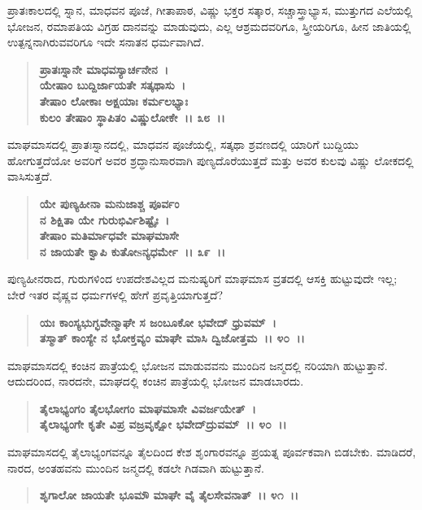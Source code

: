 ಪ್ರಾತಃಕಾಲದಲ್ಲಿ ಸ್ನಾನ, ಮಾಧವನ ಪೂಜೆ, ಗೀತಾಪಾಠ, ವಿಷ್ಣು ಭಕ್ತರ ಸತ್ಕಾರ, ಸಚ್ಚಾಸ್ತ್ರಾಭ್ಯಾಸ, ಮುತ್ತುಗದ ಎಲೆಯಲ್ಲಿ ಭೋಜನ, ರಮಾಪತಿಯ ವಿಗ್ರಹ ದಾನವನ್ನು ಮಾಡುವುದು, ಎಲ್ಲ ಆಶ್ರಮದವರಿಗೂ, ಸ್ತ್ರೀಯರಿಗೂ, ಹೀನ ಜಾತಿಯಲ್ಲಿ ಉತ್ಪನ್ನನಾಗಿರುವವರಿಗೂ ಇದೇ ಸನಾತನ ಧರ್ಮವಾಗಿದೆ.

\begin{verse}
\textbf{ಪ್ರಾತಃಸ್ನಾನೇ ಮಾಧವಸ್ಯಾರ್ಚನೇನ~।}\\\textbf{ಯೇಷಾಂ ಬುದ್ದಿರ್ಜಾಯತೇ ಸತ್ಕಥಾಸು~। }\\\textbf{ತೇಷಾಂ ಲೋಕಾಃ ಅಕ್ಷಯಾಃ ಕರ್ಮಲಭ್ಯಾಃ} \\\textbf{ಕುಲಂ ತೇಷಾಂ ಸ್ಥಾಪಿತಂ ವಿಷ್ಣುಲೋಕೇ~।। ೩೮~।।}
\end{verse}

ಮಾಘಮಾಸದಲ್ಲಿ ಪ್ರಾತಃಸ್ನಾನದಲ್ಲಿ, ಮಾಧವನ ಪೂಜೆಯಲ್ಲಿ, ಸತ್ಕಥಾ ಶ್ರವಣದಲ್ಲಿ ಯಾರಿಗೆ ಬುದ್ದಿಯು ಹೋಗುತ್ತದೆಯೋ ಅವರಿಗೆ ಅವರ ಶ್ರದ್ಧಾನುಸಾರವಾಗಿ ಪುಣ್ಯ\break ದೊರೆಯುತ್ತದೆ ಮತ್ತು ಅವರ ಕುಲವು ವಿಷ್ಣು ಲೋಕದಲ್ಲಿ ವಾಸಿಸುತ್ತದೆ.

\begin{verse}
\textbf{ಯೇ ಪುಣ್ಯಹೀನಾ ಮನುಜಾಶ್ಚ ಪೂರ್ವಂ}\\\textbf{ನ ಶಿಕ್ಷಿತಾ ಯೇ ಗುರುಭಿರ್ವಿಶಿಷ್ಟೈಃ~। }\\\textbf{ತೇಷಾಂ ಮತಿರ್ಮಾಧವೇ ಮಾಘಮಾಸೇ} \\\textbf{ನ ಜಾಯತೇ ಕ್ವಾಪಿ ಕುತೋsನ್ಯಧರ್ಮೇ~।। ೩೯~।।}
\end{verse}

ಪುಣ್ಯಹೀನರಾದ, ಗುರುಗಳಿಂದ ಉಪದೇಶವಿಲ್ಲದ ಮನುಷ್ಯರಿಗೆ ಮಾಘಮಾಸ ವ್ರತದಲ್ಲಿ ಆಸಕ್ತಿ ಹುಟ್ಟುವುದೇ ಇಲ್ಲ; ಬೇರೆ ಇತರ ವೈಷ್ಣವ ಧರ್ಮಗಳಲ್ಲಿ ಹೇಗೆ ಪ್ರವೃತ್ತಿಯಾಗುತ್ತದೆ?

\begin{verse}
\textbf{ಯಃ ಕಾಂಸ್ಯಭುಗ್ಭವೇನ್ಮಾಘೇ ಸ ಜಂಬೂಕೋ ಭವೇದ್ ಧ್ರುವಮ್~।}\\\textbf{ತಸ್ಮಾತ್ ಕಾಂಸ್ಯೇ ನ ಭೋಕ್ತವ್ಯಂ ಮಾಘೇ ಮಾಸಿ ದ್ವಿಜೋತ್ತಮ~।। ೪೦~।।}
\end{verse}

ಮಾಘಮಾಸದಲ್ಲಿ ಕಂಚಿನ ಪಾತ್ರೆಯಲ್ಲಿ ಭೋಜನ ಮಾಡುವವನು ಮುಂದಿನ ಜನ್ಮದಲ್ಲಿ ನರಿಯಾಗಿ ಹುಟ್ಟುತ್ತಾನೆ. ಆದುದರಿಂದ, ನಾರದನೇ, ಮಾಘದಲ್ಲಿ ಕಂಚಿನ ಪಾತ್ರೆಯಲ್ಲಿ ಭೋಜನ ಮಾಡಬಾರದು.

\begin{verse}
\textbf{ತೈಲಾಭ್ಯಂಗಂ ತೈಲಭೋಗಂ ಮಾಘಮಾಸೇ ವಿವರ್ಜಯೇತ್~।}\\\textbf{ತೈಲಾಭ್ಯಂಗೇ ಕೃತೇ ವಿಪ್ರ ವಜ್ರವೃಕ್ಷೋ ಭವೇದ್‌ದ್ರುವಮ್~।। ೪೦~।।}
\end{verse}

ಮಾಘಮಾಸದಲ್ಲಿ ತೈಲಾಭ್ಯಂಗವನ್ನೂ ತೈಲದಿಂದ ಕೇಶ ಶೃಂಗಾರವನ್ನೂ ಪ್ರಯತ್ನ ಪೂರ್ವಕವಾಗಿ ಬಿಡಬೇಕು. ಮಾಡಿದರೆ, ನಾರದ, ಅಂತಹವನು ಮುಂದಿನ ಜನ್ಮದಲ್ಲಿ ಕಡಲೇ ಗಿಡವಾಗಿ ಹುಟ್ಟುತ್ತಾನೆ.

\begin{verse}
\textbf{ಶೃಗಾಲೋ ಜಾಯತೇ ಭೂಮೌ ಮಾಘೇ ವೈ ತೈಲಸೇವನಾತ್~।। ೪೧~।।}
\end{verse}

